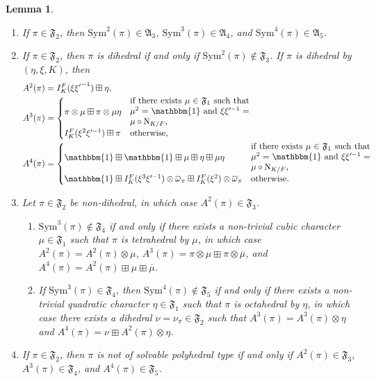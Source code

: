 \documentclass[11pt]{amsart}
\newtheorem{lemma}[theorem]{Lemma}
\theoremstyle{remark}
\newcommand{\Sym}{\mathrm{Sym}}
\renewcommand{\bar}{\overline}
\numberwithin{equation}{section}
\begin{document}
\begin{lemma}
\label{symmetric power decomposition}\cite{GJ,Kim,KimShahidi2,KimShahidi,Ramakrishnan}
\begin{enumerate}[leftmargin=*]
	\item If $\pi\in\mathfrak{F}_{2}$, then $\mathrm{Sym}^2(\pi)\in\mathfrak{A}_{3}$, $\mathrm{Sym}^3(\pi)\in\mathfrak{A}_{4}$, and $\mathrm{Sym}^4(\pi)\in\mathfrak{A}_{5}$.
	\item If $\pi\in\mathfrak{F}_2$, then $\pi$ is dihedral if and only if $\mathrm{Sym}^2(\pi)\notin\mathfrak{F}_{3}$.  If $\pi$ is dihedral by $(\eta,\xi,K)$, then
	\begin{align*}
	A^2(\pi) &= I_K^F(\xi{\xi'}^{-1})\boxplus \eta,\\
	A^3(\pi)&=\begin{cases}
		\pi\otimes\mu\boxplus \pi\otimes\mu\eta &\parbox{0.4\linewidth}{if there exists $\mu\in\mathfrak{F}_1$ such that $\mu^2=\mathbbm{1}$ and $\xi\xi'^{-1}=\mu\circ\mathrm{N}_{K/F}$,}\\
		I_K^F(\xi^2\xi'^{-1})\boxplus\pi &\mbox{otherwise,}
	\end{cases}\\
	A^4(\pi)&=\begin{cases}
		\mathbbm{1}\boxplus		\mathbbm{1}\boxplus\mu\boxplus\eta\boxplus\mu\eta &\parbox{0.4\linewidth}{if there exists $\mu\in\mathfrak{F}_1$ such that $\mu^2=\mathbbm{1}$ and $\xi\xi'^{-1}=\mu\circ\mathrm{N}_{K/F}$,}\\
		\mathbbm{1}\boxplus I_K^F(\xi^3\xi'^{-1})\otimes\overline{\omega}_{\pi}\boxplus I_K^F(\xi^2)\otimes\overline{\omega}_{\pi}&\mbox{otherwise.}
	\end{cases}
	\end{align*}
	\item Let $\pi\in\mathfrak{F}_{2}$ be non-dihedral, in which case $A^2(\pi)\in\mathfrak{F}_{3}$.
	\begin{enumerate}
	\item $\Sym^3(\pi)\notin\mathfrak{F}_4$ if and only if there exists a non-trivial cubic character $\mu\in\mathfrak{F}_1$ such that $\pi$ is tetrahedral by $\mu$, in which case $A^2(\pi)=A^2(\pi)\otimes\mu$, $A^3(\pi)=\pi\otimes\mu \boxplus\pi\otimes\bar{\mu}$, and $A^4(\pi) = A^2(\pi)\boxplus \mu\boxplus\overline{\mu}$.
	\item If $\mathrm{Sym}^3(\pi)\in\mathfrak{F}_{4}$, then $\mathrm{Sym}^4(\pi)\notin\mathfrak{F}_{5}$ if and only if there exists a non-trivial quadratic character $\eta\in\mathfrak{F}_1$ such that $\pi$ is octahedral by $\eta$, in which case there exists a dihedral $\nu=\nu_{\pi}\in\mathfrak{F}_2$ such that $A^3(\pi)=A^3(\pi)\otimes\eta$ and $A^4(\pi) =  \nu \boxplus A^2(\pi)\otimes\eta$.
\end{enumerate}
\item If $\pi\in\mathfrak{F}_2$, then $\pi$ is not of solvable polyhedral type if and only if $A^2(\pi)\in\mathfrak{F}_3$, $A^3(\pi)\in\mathfrak{F}_4$, and $A^4(\pi)\in\mathfrak{F}_5$.
\end{enumerate}
\end{lemma}
\end{document}
